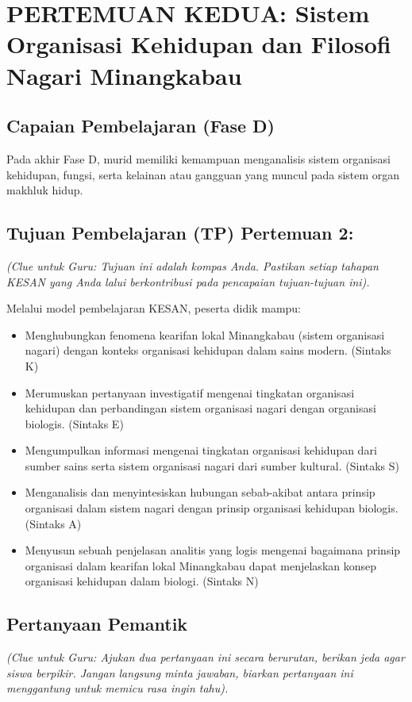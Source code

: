 \documentclass[a4paper,12pt]{article}
\begin{document}
\section{PERTEMUAN KEDUA: Sistem Organisasi Kehidupan dan Filosofi Nagari Minangkabau}

\subsection{Capaian Pembelajaran (Fase D)}
Pada akhir Fase D, murid memiliki kemampuan menganalisis sistem organisasi kehidupan, fungsi, serta kelainan atau gangguan yang muncul pada sistem organ makhluk hidup.

\subsection{Tujuan Pembelajaran (TP) Pertemuan 2:}
\textit{(Clue untuk Guru: Tujuan ini adalah kompas Anda. Pastikan setiap tahapan KESAN yang Anda lalui berkontribusi pada pencapaian tujuan-tujuan ini).}

Melalui model pembelajaran KESAN, peserta didik mampu:
\begin{itemize}
\item Menghubungkan fenomena kearifan lokal Minangkabau (sistem organisasi nagari) dengan konteks organisasi kehidupan dalam sains modern. (Sintaks K)
\item Merumuskan pertanyaan investigatif mengenai tingkatan organisasi kehidupan dan perbandingan sistem organisasi nagari dengan organisasi biologis. (Sintaks E)
\item Mengumpulkan informasi mengenai tingkatan organisasi kehidupan dari sumber sains serta sistem organisasi nagari dari sumber kultural. (Sintaks S)
\item Menganalisis dan menyintesiskan hubungan sebab-akibat antara prinsip organisasi dalam sistem nagari dengan prinsip organisasi kehidupan biologis. (Sintaks A)
\item Menyusun sebuah penjelasan analitis yang logis mengenai bagaimana prinsip organisasi dalam kearifan lokal Minangkabau dapat menjelaskan konsep organisasi kehidupan dalam biologi. (Sintaks N)
\end{itemize}

\subsection{Pertanyaan Pemantik}
\textit{(Clue untuk Guru: Ajukan dua pertanyaan ini secara berurutan, berikan jeda agar siswa berpikir. Jangan langsung minta jawaban, biarkan pertanyaan ini menggantung untuk memicu rasa ingin tahu).}
\end{document}
